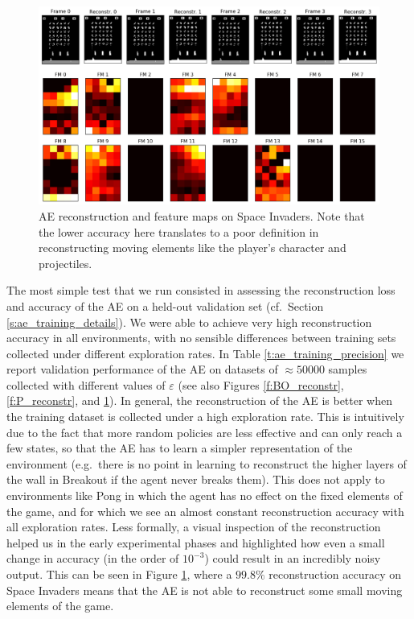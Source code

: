 %
%
\begin{figure}
    \includegraphics[width=\textwidth]{pictures/experiments/reconstr_space_invaders}
    \centering
    \caption[AE reconstruction and feature maps on Space Invaders]{AE 
	    reconstruction and feature maps on Space Invaders. Note that the 
	    lower accuracy here translates to a poor definition in 
	    reconstructing moving elements like the player's character and 
	    projectiles.}
    \label{f:SI_reconstr}
\end{figure}
%

The most simple test that we run consisted in assessing the reconstruction loss
and accuracy of the AE on a held-out validation set (cf.\ Section \ref{s:ae_training_details}). 
We were able to achieve very high reconstruction accuracy in all environments, 
with no sensible differences between training sets collected under different 
exploration rates. In Table \ref{t:ae_training_precision} we report validation 
performance of the AE on datasets of $\approx50000$ samples collected with 
different values of $\varepsilon$ (see also Figures \ref{f:BO_reconstr}, 
\ref{f:P_reconstr}, and \ref{f:SI_reconstr}). 
In general, the reconstruction of the AE is better when the training dataset is
collected under a high exploration rate. This is intuitively due to the fact 
that more random policies are less effective and can only reach a few states, so
that the AE has to learn a simpler representation of the environment (e.g.\ 
there is no point in learning to reconstruct the higher layers of the wall in 
Breakout if the agent never breaks them).
This does not apply to environments like Pong in which the agent has no effect 
on the fixed elements of the game, and for which we see an almost constant
reconstruction accuracy with all exploration rates. 
Less formally, a visual inspection of the reconstruction helped us in the early 
experimental phases and highlighted how even a small change in accuracy (in the
order of $10^{-3}$) could result in an incredibly noisy output. This can be
seen in Figure \ref{f:SI_reconstr}, where a $99.8\%$ reconstruction accuracy 
on Space Invaders means that the AE is not able to reconstruct some small moving 
elements of the game.


